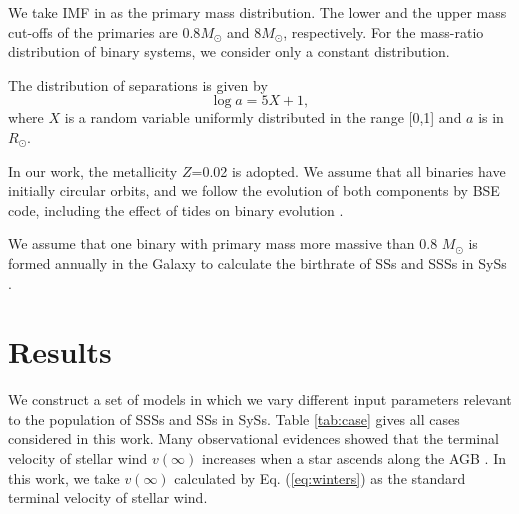 \documentclass{elsart}
\begin{document}
We take IMF in \cite{ktg93} as the primary mass distribution. The
lower and the upper mass cut-offs of the primaries are $0.8M_\odot$
and $8M_\odot$, respectively. For the mass-ratio distribution of
binary systems, we consider only
a constant distribution\citep{kr79,m92,gm94}.%


The distribution of separations is given by
\begin{equation}
\log a =5X+1,
\end{equation}
where $X$ is a random variable uniformly distributed in the range
[0,1] and $a$ is in $R_\odot$.

In our work, the metallicity $Z$=0.02 is adopted. We assume that all
binaries have initially circular orbits, and we follow the evolution
of both components by BSE code, including the effect of tides on
binary evolution \citep{h02}.

We assume that one binary with primary mass more massive than 0.8
$M_\odot$ is formed annually in the Galaxy to calculate the
birthrate of SSs and SSSs in SySs \citep{yun94,h95a,h95b}.

\section{Results}
\label{res} We construct a set of models in which we vary different
input parameters relevant to the population of SSSs and SSs in SySs.
Table \ref{tab:case} gives all cases considered in this work. Many
observational evidences showed that the terminal velocity of stellar
wind $v(\infty)$ increases when a star ascends along the AGB
\citep{o02,w03,b05}. In this work, we take $v(\infty)$ calculated by
Eq. (\ref{eq:winters}) as the standard terminal velocity of stellar
wind.
\end{document}
